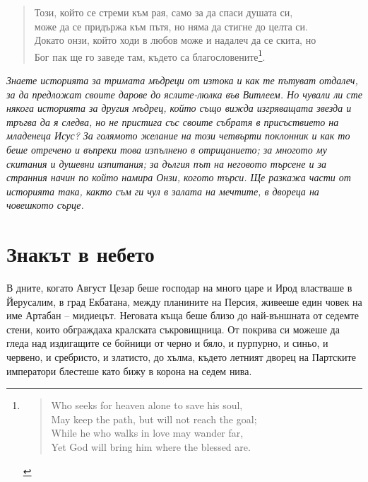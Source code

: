 \thispagestyle{plain}

\begin{quote}
  \fontsize{8}{10}\selectfont
  \begin{obeylines}
    \setlength{\parskip}{.1em}
    Този, който се стреми към рая, само за да спаси душата си,
    може да се придържа към пътя, но няма да стигне до целта си.
    Докато онзи, който ходи в любов може и надалеч да се скита, но
    Бог пак ще го заведе там, където са благословените\footnote{
    \vspace{-0.55cm}
    \begin{quote}
      \setlength{\leftskip}{-0.25cm}
      \begin{otherlanguage}{english}
        Who seeks for heaven alone to save his soul,
        May keep the path, but will not reach the goal;
        While he who walks in love may wander far,
        Yet God will bring him where the blessed are.
      \end{otherlanguage}
    \end{quote}
    }.
  \end{obeylines}
\end{quote}

\vspace{2cm}

\emph{Знаете историята за тримата мъдреци от изтока и как те пътуват отдалеч, за
да предложат своите дарове до яслите-люлка във Витлеем. Но чували ли сте някога
историята за другия мъдрец, който също вижда изгряващата звезда и тръгва да я
следва, но не пристига със своите събратя в присъствието на младенеца Исус? За
голямото желание на този четвърти поклонник и как то беше отречено и въпреки
това изпълнено в отрицанието; за многото му скитания и душевни изпитания; за
дългия път на неговото търсене и за странния начин по който намира Онзи, когото
търси. Ще разкажа части от историята така, както съм ги чул в залата на мечтите,
в двореца на човешкото сърце.}

\newpage

\part{Знакът в небето}

В дните, когато Август Цезар беше господар на много царе и Ирод властваше в
Йерусалим, в град Екбатана, между планините на Персия, живееше един човек на име
Артабан -- мидиецът. Неговата къща беше близо до най-външната от седемте стени,
които обграждаха кралската съкровищница. От покрива си можеше да гледа над
издигащите се бойници от черно и бяло, и пурпурно, и синьо, и червено, и
сребристо, и златисто, до хълма, където летният дворец на Партските императори
блестеше като бижу в корона на седем нива.

